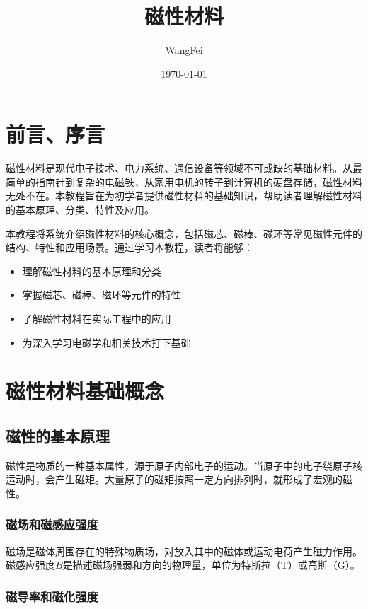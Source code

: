 \documentclass[12pt,UTF8]{ctexbook}
\title{\heiti\zihao{0} 磁性材料}
\author{WangFei}
\date{\today}
\begin{document}
\maketitle
\tableofcontents

\frontmatter
\chapter{前言、序言}

磁性材料是现代电子技术、电力系统、通信设备等领域不可或缺的基础材料。从最简单的指南针到复杂的电磁铁，从家用电机的转子到计算机的硬盘存储，磁性材料无处不在。本教程旨在为初学者提供磁性材料的基础知识，帮助读者理解磁性材料的基本原理、分类、特性及应用。

本教程将系统介绍磁性材料的核心概念，包括磁芯、磁棒、磁环等常见磁性元件的结构、特性和应用场景。通过学习本教程，读者将能够：

\begin{itemize}[leftmargin=2cm]
    \item 理解磁性材料的基本原理和分类
    \item 掌握磁芯、磁棒、磁环等元件的特性
    \item 了解磁性材料在实际工程中的应用
    \item 为深入学习电磁学和相关技术打下基础
\end{itemize}

\mainmatter

\chapter{磁性材料基础概念}

\section{磁性的基本原理}

磁性是物质的一种基本属性，源于原子内部电子的运动。当原子中的电子绕原子核运动时，会产生磁矩。大量原子的磁矩按照一定方向排列时，就形成了宏观的磁性。

\subsection{磁场和磁感应强度}

磁场是磁体周围存在的特殊物质场，对放入其中的磁体或运动电荷产生磁力作用。磁感应强度$B$是描述磁场强弱和方向的物理量，单位为特斯拉（T）或高斯（G）。

\subsection{磁导率和磁化强度}
\end{document}
